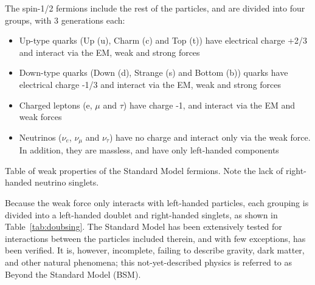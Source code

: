 \documentclass[/main.tex]{subfiles}
\begin{document}
The spin-1/2 fermions include the rest of the particles, and are divided into four groups, with 3 generations each:
\begin{itemize}
\item Up-type quarks (Up (u), Charm (c) and Top (t)) have electrical charge +2/3 and interact via the EM, weak and strong forces
\item Down-type quarks (Down (d), Strange (s) and Bottom (b)) quarks have electrical charge -1/3 and interact via the EM, weak and strong forces
\item Charged leptons (e, $\mu$ and $\tau$) have charge -1, and interact via the EM and weak forces
\item Neutrinos ($\nu_e$, $\nu_\mu$ and $\nu_\tau$) have no charge and interact only via the weak force. In addition, they are massless, and have only left-handed components
\end{itemize}
\begin{table}[h]
  \caption[Weak properties of Fermions]{\label{tab:doubsing}
    Table of weak properties of the Standard Model fermions. Note the lack of right-handed neutrino singlets.
  }
  \centering
  
\end{table}
Because the weak force only interacts with left-handed particles, each grouping is divided into a left-handed doublet and right-handed singlets, as shown in Table~\ref{tab:doubsing}.
The Standard Model has been extensively tested for interactions between the particles included therein, and with few exceptions, has been verified.
It is, however, incomplete, failing to describe gravity, dark matter, and other natural phenomena; this not-yet-described physics is referred to as Beyond the Standard Model (BSM).
\end{document}
